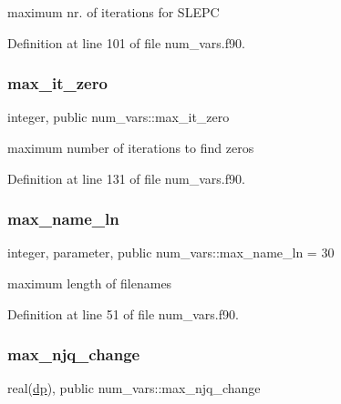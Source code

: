 maximum nr. of iterations for S\+L\+E\+PC 



Definition at line 101 of file num\+\_\+vars.\+f90.

\mbox{\label{namespacenum__vars_ad35971574ecb900c805b8d08745160e6}} 
\subsubsection{\texorpdfstring{max\+\_\+it\+\_\+zero}{max\_it\_zero}}
{\footnotesize\ttfamily integer, public num\+\_\+vars\+::max\+\_\+it\+\_\+zero}



maximum number of iterations to find zeros 



Definition at line 131 of file num\+\_\+vars.\+f90.

\mbox{\label{namespacenum__vars_a1b79c43315241705b429443dfe798837}} 
\subsubsection{\texorpdfstring{max\+\_\+name\+\_\+ln}{max\_name\_ln}}
{\footnotesize\ttfamily integer, parameter, public num\+\_\+vars\+::max\+\_\+name\+\_\+ln = 30}



maximum length of filenames 



Definition at line 51 of file num\+\_\+vars.\+f90.

\mbox{\label{namespacenum__vars_a2f7c3870fc9449cf70e4bf44612a8b9a}} 
\subsubsection{\texorpdfstring{max\+\_\+njq\+\_\+change}{max\_njq\_change}}
{\footnotesize\ttfamily real(\hyperlink{namespacenum__vars_a03802aa2bd86439d7a9370836fabf3f2}{dp}), public num\+\_\+vars\+::max\+\_\+njq\+\_\+change}




